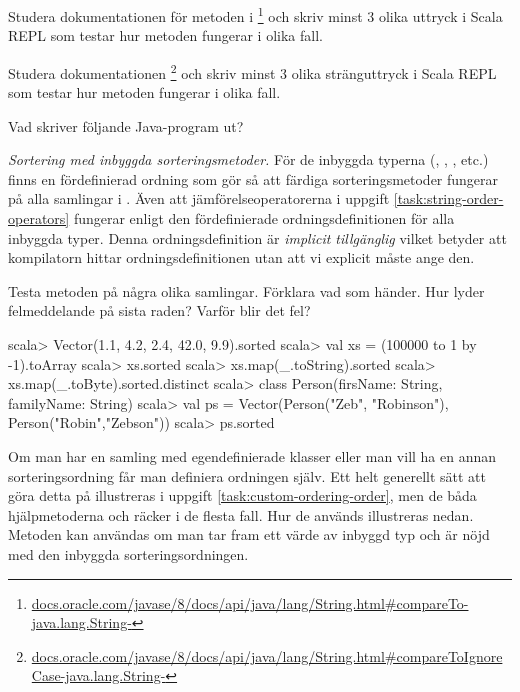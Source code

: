 \Subtask Studera dokumentationen för metoden  i \footnote{\href{https://docs.oracle.com/javase/8/docs/api/java/lang/String.html\#compareTo-java.lang.String-}{docs.oracle.com/javase/8/docs/api/java/lang/String.html\#compareTo-java.lang.String-}} och skriv minst 3 olika uttryck i Scala REPL som testar hur metoden fungerar i olika fall. 

\Subtask Studera dokumentationen  \footnote{\href{https://docs.oracle.com/javase/8/docs/api/java/lang/String.html\#compareToIgnoreCase-java.lang.String-}{docs.oracle.com/javase/8/docs/api/java/lang/String.html\#compareToIgnoreCase-java.lang.String-}} och skriv minst 3 olika stränguttryck i Scala REPL som testar hur metoden fungerar i olika fall. 

\Subtask Vad skriver följande Java-program ut?


\Task \emph{Sortering med inbyggda sorteringsmetoder.} För de inbyggda typerna (, , , etc.) finns en fördefinierad ordning som gör så att färdiga sorteringsmetoder fungerar på alla samlingar i . Även att jämförelseoperatorerna i uppgift \ref{task:string-order-operators} fungerar enligt den fördefinierade ordningsdefinitionen för alla inbyggda typer. Denna ordningsdefinition är \textit{implicit tillgänglig} vilket betyder att kompilatorn hittar ordningsdefinitionen utan att vi explicit måste ange den.

\Subtask Testa metoden  på några olika samlingar. Förklara vad som händer. Hur lyder felmeddelande på sista raden? Varför blir det fel?

\begin{REPL}
scala> Vector(1.1, 4.2, 2.4, 42.0, 9.9).sorted
scala> val xs = (100000 to 1 by -1).toArray
scala> xs.sorted
scala> xs.map(_.toString).sorted
scala> xs.map(_.toByte).sorted.distinct
scala> class Person(firsName: String, familyName: String)
scala> val ps = Vector(Person("Zeb", "Robinson"), Person("Robin","Zebson")) 
scala> ps.sorted
\end{REPL}	

\Subtask Om man har en samling med egendefinierade klasser eller man vill ha en annan sorteringsordning får man definiera ordningen själv. Ett helt generellt sätt att göra detta på  illustreras i uppgift \ref{task:custom-ordering-order}, men de båda hjälpmetoderna  och  räcker i de flesta fall. Hur de används illustreras nedan. Metoden  kan användas om man tar fram ett värde av inbyggd typ och är nöjd med den inbyggda sorteringsordningen. 

